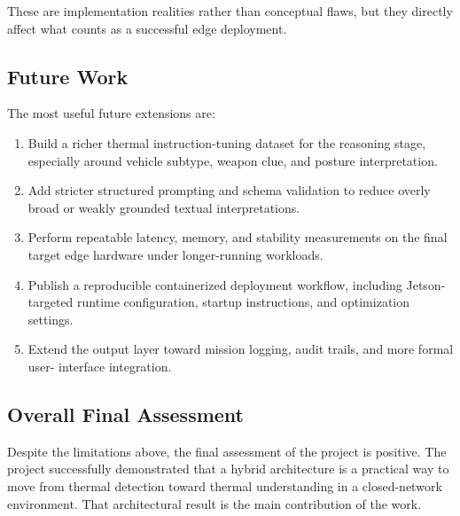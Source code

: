 These are implementation realities rather than conceptual flaws, but they directly affect what
counts as a successful edge deployment.

\subsection{Future Work}

The most useful future extensions are:

\begin{enumerate}[nosep]
  \item Build a richer thermal instruction-tuning dataset for the reasoning stage, especially
  around vehicle subtype, weapon clue, and posture interpretation.
  \item Add stricter structured prompting and schema validation to reduce overly broad or
  weakly grounded textual interpretations.
  \item Perform repeatable latency, memory, and stability measurements on the final target edge
  hardware under longer-running workloads.
  \item Publish a reproducible containerized deployment workflow, including Jetson-targeted
  runtime configuration, startup instructions, and optimization settings.
  \item Extend the output layer toward mission logging, audit trails, and more formal user-
  interface integration.
\end{enumerate}

\subsection{Overall Final Assessment}

Despite the limitations above, the final assessment of the project is positive. The project
successfully demonstrated that a hybrid architecture is a practical way to move from thermal
detection toward thermal understanding in a closed-network environment. That architectural
result is the main contribution of the work.
